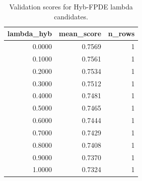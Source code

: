 \begin{table}[t]
\caption{Validation scores for Hyb-FPDE lambda candidates.}
\label{tab:lambda_distribution_computed}
\centering
\begin{tabular}{rrr}
\toprule
lambda\_hyb & mean\_score & n\_rows \\
\midrule
0.0000 & 0.7569 & 1 \\
0.1000 & 0.7561 & 1 \\
0.2000 & 0.7534 & 1 \\
0.3000 & 0.7512 & 1 \\
0.4000 & 0.7481 & 1 \\
0.5000 & 0.7465 & 1 \\
0.6000 & 0.7444 & 1 \\
0.7000 & 0.7429 & 1 \\
0.8000 & 0.7408 & 1 \\
0.9000 & 0.7370 & 1 \\
1.0000 & 0.7324 & 1 \\
\bottomrule
\end{tabular}

\end{table}
